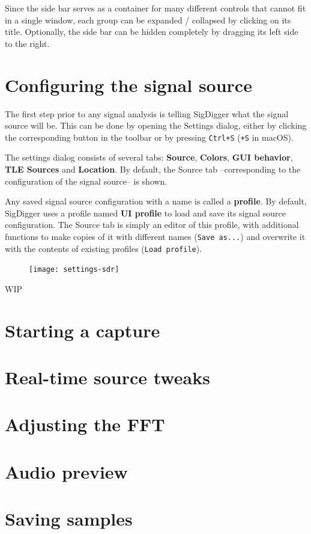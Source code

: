 \documentclass{ol-softwaremanual}
\begin{document}
Since the side bar serves as a container for many different controls that cannot fit in a single window, each group can be expanded / collapsed by clicking on its title. Optionally, the side bar can be hidden completely by dragging its left side to the right.

\section{Configuring the signal source}
The first step prior to any signal analysis is telling SigDigger what the signal source will be. This can be done by opening the Settings dialog, either by clicking the corresponding button in the toolbar or by pressing \texttt{Ctrl+S} (\texttt{\cmd+S} in macOS).

The settings dialog consists of several tabs: \textbf{Source}, \textbf{Colors}, \textbf{GUI behavior}, \textbf{TLE Sources} and \textbf{Location}. By default, the Source tab --corresponding to the configuration of the signal source-- is shown. 

Any saved signal source configuration with a name is called a \textbf{profile}. By default, SigDigger uses a profile named \textbf{UI profile} to load and save its signal source configuration. The Source tab is simply an editor of this profile, with additional functions to make copies of it with different names (\texttt{Save as...}) and overwrite it with the contents of existing profiles (\texttt{Load profile}).

\newpage
\begin{figure}[H]
    \centering
    \texttt{[image: settings-sdr]}
    \label{fig:settings-sdr}
\end{figure}

WIP

\section{Starting a capture}
\section{Real-time source tweaks}
\section{Adjusting the FFT}
\section{Audio preview}
\section{Saving samples}
\end{document}
